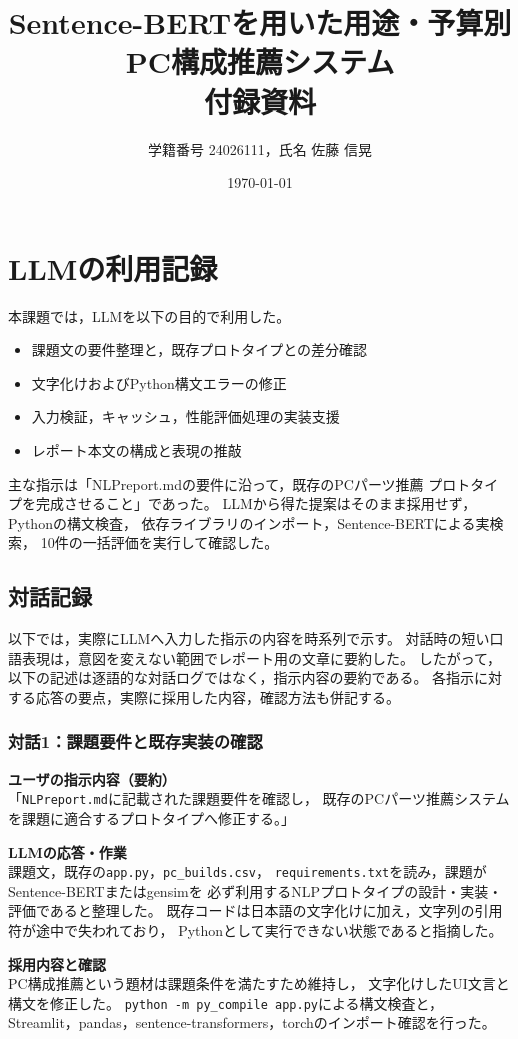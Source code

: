 \documentclass[a4paper,11pt]{article}
\title{Sentence-BERTを用いた用途・予算別PC構成推薦システム\\付録資料}
\author{学籍番号 24026111，氏名 佐藤 信晃}
\date{\today}
\begin{document}
\maketitle

\section{LLMの利用記録}
本課題では，LLMを以下の目的で利用した。
\begin{itemize}
  \item 課題文の要件整理と，既存プロトタイプとの差分確認
  \item 文字化けおよびPython構文エラーの修正
  \item 入力検証，キャッシュ，性能評価処理の実装支援
  \item レポート本文の構成と表現の推敲
\end{itemize}

主な指示は「NLPreport.mdの要件に沿って，既存のPCパーツ推薦
プロトタイプを完成させること」であった。
LLMから得た提案はそのまま採用せず，Pythonの構文検査，
依存ライブラリのインポート，Sentence-BERTによる実検索，
10件の一括評価を実行して確認した。

\subsection{対話記録}
以下では，実際にLLMへ入力した指示の内容を時系列で示す。
対話時の短い口語表現は，意図を変えない範囲でレポート用の文章に要約した。
したがって，以下の記述は逐語的な対話ログではなく，指示内容の要約である。
各指示に対する応答の要点，実際に採用した内容，確認方法も併記する。

\subsubsection*{対話1：課題要件と既存実装の確認}
\noindent
\textbf{ユーザの指示内容（要約）}\\
「\verb|NLPreport.md|に記載された課題要件を確認し，
既存のPCパーツ推薦システムを課題に適合するプロトタイプへ修正する。」

\noindent
\textbf{LLMの応答・作業}\\
課題文，既存の\verb|app.py|，\verb|pc_builds.csv|，
\verb|requirements.txt|を読み，課題がSentence-BERTまたはgensimを
必ず利用するNLPプロトタイプの設計・実装・評価であると整理した。
既存コードは日本語の文字化けに加え，文字列の引用符が途中で失われており，
Pythonとして実行できない状態であると指摘した。

\noindent
\textbf{採用内容と確認}\\
PC構成推薦という題材は課題条件を満たすため維持し，
文字化けしたUI文言と構文を修正した。
\verb|python -m py_compile app.py|による構文検査と，
Streamlit，pandas，sentence-transformers，torchのインポート確認を行った。
\end{document}
